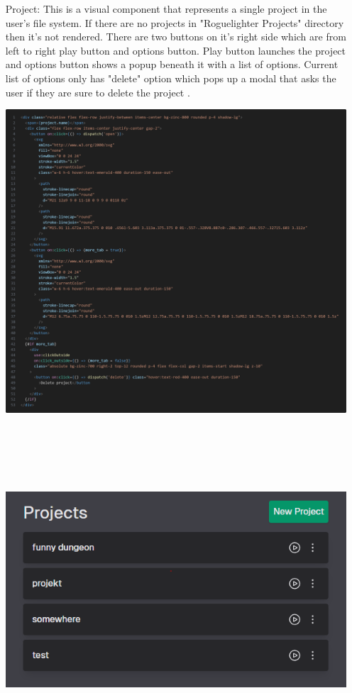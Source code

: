 \documentclass{article}
\begin{document}
\begin{itemize} 
    \item[Project:] This is a visual component that represents a single project in the user's file system. If there are no projects in "Roguelighter Projects" directory then it's not rendered. There are two buttons on it's right side which are from left to right play button and options button. Play button launches the project and options button shows a popup beneath it with a list of options. Current list of options only has "delete" option which pops up a modal that asks the user if they are sure to delete the project . 

    \begin{minipage}{\linewidth}
        \centering
        \includegraphics[width=1\textwidth]{project-code.png}
    \end{minipage}\\\\\\\\
    \begin{minipage}{\linewidth}
        \centering
        \includegraphics[width=1\textwidth]{main-menu.PNG}

\end{minipage}
\end{itemize}
\end{document}
